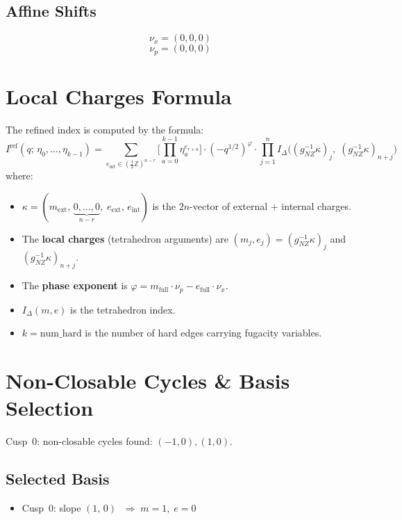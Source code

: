 \documentclass[11pt,a4paper]{article}
\begin{document}
\subsection{Affine Shifts}
$$\nu_x = (0, 0, 0)$$
$$\nu_p = (0, 0, 0)$$

\section{Local Charges Formula}
The refined index is computed by the formula:
\begin{equation}
  I^{\text{ref}}(q;\, \eta_0, \ldots, \eta_{k-1})
  = \sum_{e_{\text{int}} \in (\frac{1}{2}\mathbb{Z})^{n-r}}
    \biggl[\prod_{a=0}^{k-1} \eta_a^{e_{r+a}}\biggr]
    \cdot (-q^{1/2})^{\varphi}
    \cdot \prod_{j=1}^{n}
      I_\Delta\bigl((g_{NZ}^{-1}\kappa)_j,\;
                     (g_{NZ}^{-1}\kappa)_{n+j}\bigr)
\end{equation}
where:
\begin{itemize}
  \item $\kappa = (m_{\text{ext}},\, \underbrace{0,\ldots,0}_{n-r},\; e_{\text{ext}},\, e_{\text{int}})$ is the $2n$-vector of external + internal charges.
  \item The \textbf{local charges} (tetrahedron arguments) are $(m_j, e_j) = (g_{NZ}^{-1}\kappa)_j$ and $(g_{NZ}^{-1}\kappa)_{n+j}$.
  \item The \textbf{phase exponent} is $\varphi = m_{\text{full}} \cdot \nu_p - e_{\text{full}} \cdot \nu_x$.
  \item $I_\Delta(m, e)$ is the tetrahedron index.
  \item $k = \text{num\_hard}$ is the number of hard edges carrying fugacity variables.
\end{itemize}

\section{Non-Closable Cycles \& Basis Selection}
Cusp~0: non-closable cycles found: $(-1, 0), (1, 0)$.

\subsection*{Selected Basis}
\begin{itemize}
  \item Cusp~0: slope $(1,\, 0)$ $\;\Rightarrow\; m = 1,\; e = 0$
\end{itemize}
\end{document}
